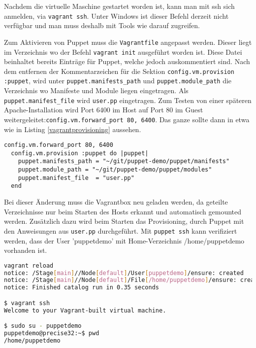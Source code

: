 \documentclass[12pt,a4paper,ngerman]{article}
\begin{document}
Nachdem die virtuelle Maschine gestartet worden ist, kann man mit ssh sich anmelden, via \lstinline[language=bash]$vagrant ssh$. Unter Windows ist dieser Befehl derzeit nicht verfügbar und man muss deshalb mit Tools wie \cite{putty} darauf zugreifen.

 
Zum Aktivieren von Puppet muss die \lstinline$Vagrantfile$ angepasst werden. Dieser liegt im Verzeichnis wo der Befehl \lstinline$vagrant init$ ausgeführt worden ist. Diese Datei beinhaltet bereits Einträge für Puppet, welche jedoch auskommentiert sind. Nach dem entfernen der Kommentarzeichen für die Sektion \lstinline$config.vm.provision :puppet$, wird unter \lstinline$puppet.manifests_path$ und \lstinline$puppet.module_path$ die Verzeichnis wo Manifeste und Module liegen eingetragen. Als \lstinline$puppet.manifest_file$ wird \lstinline$user.pp$ eingetragen. Zum Testen von einer späteren Apache-Installation wird Port 6400 im Host auf Port 80 im Guest weitergeleitet:\lstinline$config.vm.forward_port 80, 6400$. Das ganze sollte dann in etwa wie in Listing \ref{vagrantprovisioning} aussehen.
  
\begin{lstlisting}[language=vagrant,caption=Puppet Provisioning in Vagrantfile konfigurieren, label=vagrantprovisioning]
  config.vm.forward_port 80, 6400  
  config.vm.provision :puppet do |puppet|
    puppet.manifests_path = "~/git/puppet-demo/puppet/manifests"
    puppet.module_path = "~/git/puppet-demo/puppet/modules"
    puppet.manifest_file  = "user.pp"
  end
\end{lstlisting} 

Bei dieser Änderung muss die Vagrantbox neu geladen werden, da geteilte Verzeichnisse nur beim Starten des Hosts erkannt und automatisch gemounted werden. Zusätzlich dazu wird beim Starten das Provisioning, durch Puppet mit den Anweisungen aus \lstinline$user.pp$ durchgeführt. Mit \lstinline$puppet ssh$ kann verifiziert werden, dass der User 'puppetdemo' mit Home-Verzeichnis /home/puppetdemo vorhanden ist.

\begin{lstlisting}[language=sh,caption=Vagrant Box neu laden, label=vagrant-reload]
vagrant reload
notice: /Stage[main]//Node[default]/User[puppetdemo]/ensure: created
notice: /Stage[main]//Node[default]/File[/home/puppetdemo]/ensure: created
notice: Finished catalog run in 0.35 seconds

$ vagrant ssh
Welcome to your Vagrant-built virtual machine.

$ sudo su - puppetdemo
puppetdemo@precise32:~$ pwd
/home/puppetdemo
\end{lstlisting}
\end{document}
